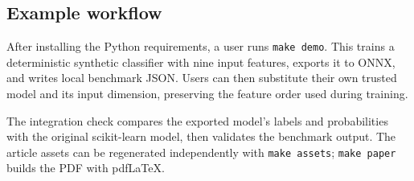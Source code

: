 \subsection{Example workflow}
After installing the Python requirements, a user runs \texttt{make demo}. This trains a deterministic synthetic classifier with nine input features, exports it to ONNX, and writes local benchmark JSON. Users can then substitute their own trusted model and its input dimension, preserving the feature order used during training.

The integration check compares the exported model's labels and probabilities with the original scikit-learn model, then validates the benchmark output. The article assets can be regenerated independently with \texttt{make assets}; \texttt{make paper} builds the PDF with pdfLaTeX.
